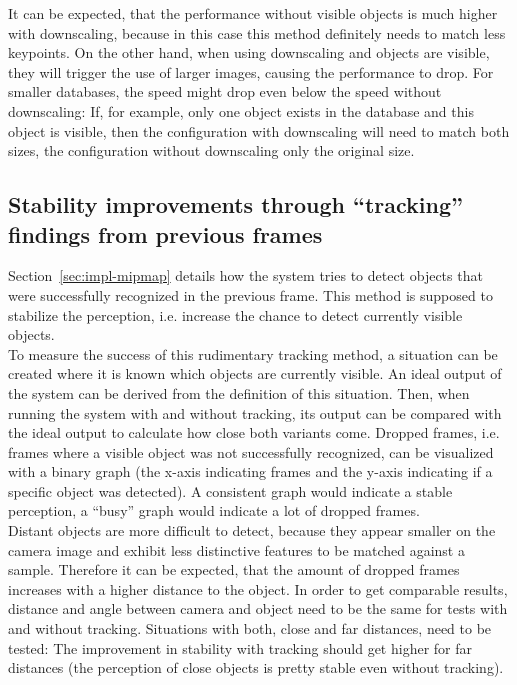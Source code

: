 It can be expected, that the performance without visible objects is much higher with downscaling, because in this case this method definitely needs to match less keypoints. On the other hand, when using downscaling and objects are visible, they will trigger the use of larger images, causing the performance to drop. For smaller databases, the speed might drop even below the speed without downscaling: If, for example, only one object exists in the database and this object is visible, then the configuration with downscaling will need to match both sizes, the configuration without downscaling only the original size.


\subsection{Stability improvements through ``tracking'' findings from previous frames}
\label{sec:analysis-tracking}
Section~\ref{sec:impl-mipmap} details how the system tries to detect objects that were successfully recognized in the previous frame. This method is supposed to stabilize the perception, i.e. increase the chance to detect currently visible objects. \\

To measure the success of this rudimentary tracking method, a situation can be created where it is known which objects are currently visible. An ideal output of the system can be derived from the definition of this situation. Then, when running the system with and without tracking, its output can be compared with the ideal output to calculate how close both variants come. Dropped frames, i.e. frames where a visible object was not successfully recognized, can be visualized with a binary graph (the x-axis indicating frames and the y-axis indicating if a specific object was detected). A consistent graph would indicate a stable perception, a ``busy'' graph would indicate a lot of dropped frames. \\

Distant objects are more difficult to detect, because they appear smaller on the camera image and exhibit less distinctive features to be matched against a sample. Therefore it can be expected, that the amount of dropped frames increases with a higher distance to the object. In order to get comparable results, distance and angle between camera and object need to be the same for tests with and without tracking. Situations with both, close and far distances, need to be tested: The improvement in stability with tracking should get higher for far distances (the perception of close objects is pretty stable even without tracking).


